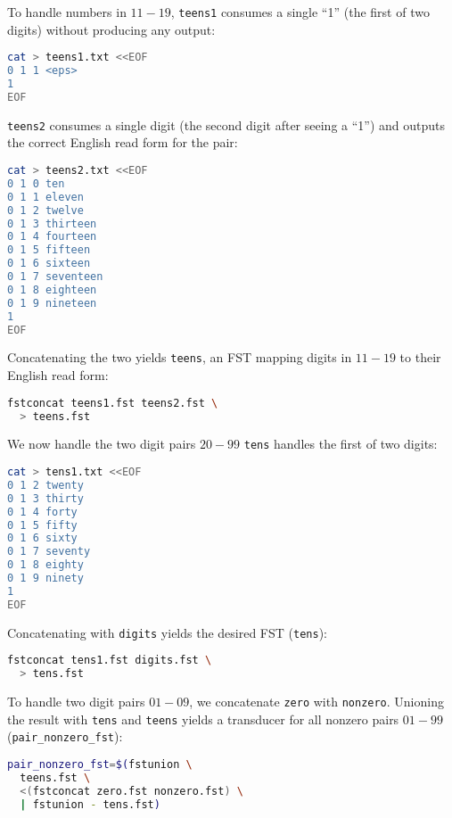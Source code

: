 \documentclass[a4paper,oneside,reqno]{amsart}
\begin{document}
\begin{enumerate}[label=\arabic*.]
    To handle numbers in $11-19$, \texttt{teens1} consumes a single ``1''
    (the first of two digits) without producing any output:
    \begin{lstlisting}[language=bash]
cat > teens1.txt <<EOF
0 1 1 <eps>
1
EOF
    \end{lstlisting}
    \texttt{teens2} consumes a single digit (the second digit after seeing a ``1'')
    and outputs the correct English read form for the pair:
    \begin{lstlisting}[language=bash]
cat > teens2.txt <<EOF
0 1 0 ten
0 1 1 eleven
0 1 2 twelve
0 1 3 thirteen
0 1 4 fourteen
0 1 5 fifteen
0 1 6 sixteen
0 1 7 seventeen
0 1 8 eighteen
0 1 9 nineteen
1
EOF
    \end{lstlisting}
    Concatenating the two yields \texttt{teens}, an FST mapping digits in $11-19$
    to their English read form:
    \begin{lstlisting}[language=bash]
fstconcat teens1.fst teens2.fst \
  > teens.fst
    \end{lstlisting}

    We now handle the two digit pairs $20-99$
    \texttt{tens} handles the first of two digits:
    \begin{lstlisting}[language=bash]
cat > tens1.txt <<EOF
0 1 2 twenty
0 1 3 thirty
0 1 4 forty
0 1 5 fifty
0 1 6 sixty
0 1 7 seventy
0 1 8 eighty
0 1 9 ninety
1
EOF
    \end{lstlisting}
    Concatenating with \texttt{digits} yields the desired FST (\texttt{tens}):
    \begin{lstlisting}[language=bash]
fstconcat tens1.fst digits.fst \
  > tens.fst
    \end{lstlisting}

    To handle two digit pairs $01-09$, we concatenate \texttt{zero}
    with \texttt{nonzero}. Unioning the result with \texttt{tens}
    and \texttt{teens} yields a transducer for all nonzero pairs $01-99$ (\texttt{pair\_nonzero\_fst}):
    \begin{lstlisting}[language=bash]
pair_nonzero_fst=$(fstunion \
  teens.fst \
  <(fstconcat zero.fst nonzero.fst) \
  | fstunion - tens.fst)
    \end{lstlisting}


\end{enumerate}
\end{document}
